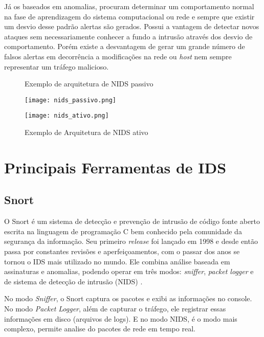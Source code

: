  Já os baseados em anomalias, procuram determinar um comportamento normal na fase de aprendizagem do sistema computacional ou rede e sempre que existir um desvio desse padrão alertas são gerados. Possui a vantagem de detectar novos ataques sem necessariamente conhecer a fundo a intrusão através dos desvio de comportamento. Porém existe a desvantagem de gerar um grande número de falsos alertas em decorrência a modificações na rede ou \textit{host} nem sempre representar um tráfego malicioso. 

\begin{figure}[htb]
 \label{fig:nids-arquitetura}
 \centering
 \begin{minipage}{0.4\textwidth}
  \centering
  \label{fig:nids-passivo}
  \caption{Exemplo de arquitetura de NIDS passivo}
  \texttt{[image: nids\_passivo.png]}
 \end{minipage}
 \hfill
 \begin{minipage}{0.4\textwidth}
  \centering
  \label{fig:nids-ativo}
  \caption{Exemplo de Arquitetura de NIDS ativo}
  \texttt{[image: nids\_ativo.png]}
 \end{minipage}
\end{figure}

\section{Principais Ferramentas de IDS} \label{sec:idps-ferramentas}
\subsection{Snort} \label{sec:snort}

O Snort é um sistema de detecção e prevenção de intrusão de código fonte aberto escrita na linguagem de programação C bem conhecido pela comunidade da segurança da informação. Seu primeiro \textit{release} foi lançado em 1998 e desde então passa por constantes revisões e aperfeiçoamentos, com o passar dos anos se tornou o IDS mais utilizado no mundo. Ele combina análise baseada em assinaturas e anomalias, podendo operar em três modos: \textit{sniffer}, \textit{packet logger} e de sistema de detecção de intrusão (NIDS) \cite{snortorgbr}.

No modo \textit{Sniffer}, o Snort captura os pacotes e exibi as informações no console. No modo \textit{Packet Logger}, além de capturar o tráfego, ele registrar essas informações em disco (arquivos de logs). E no modo NIDS, é o modo mais complexo, permite analise do pacotes de rede em tempo real.

